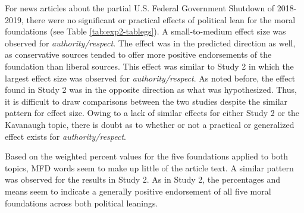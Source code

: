 \documentclass[
  man,floatsintext]{apa6}
\begin{document}
For news articles about the partial U.S. Federal Government Shutdown of
2018-2019, there were no significant or practical effects of political
lean for the moral foundations (see Table \ref{tab:exp2-tablegs}). A
small-to-medium effect size was observed for \emph{authority/respect}. The
effect was in the predicted direction as well, as conservative sources
tended to offer more positive endorsements of the foundation than
liberal sources. This effect was similar to Study 2 in which the largest
effect size was observed for \emph{authority/respect}. As noted before, the
effect found in Study 2 was in the opposite direction as what was
hypothesized. Thus, it is difficult to draw comparisons between the two
studies despite the similar pattern for effect size. Owing to a lack of
similar effects for either Study 2 or the Kavanaugh topic, there is
doubt as to whether or not a practical or generalized effect exists for
\emph{authority/respect}.

Based on the weighted percent values for the five foundations applied to
both topics, MFD words seem to make up little of the article text. A
similar pattern was observed for the results in Study 2. As in Study 2,
the percentages and means seem to indicate a generally positive
endorsement of all five moral foundations across both political
leanings.
\end{document}

